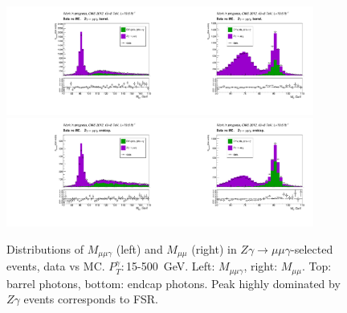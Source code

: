 \begin{figure}[htb]
  \begin{center}
   \includegraphics[width=0.45\textwidth]{../figs/figs_v11/MUON_ZGamma/PrepareYields/c_TotalDATAvsMC_Barrel__MpholeplepVERY_PRELIMINARY.pdf}\includegraphics[width=0.45\textwidth]{../figs/figs_v11/MUON_ZGamma/PrepareYields/c_TotalDATAvsMC_Barrel__MleplepVERY_PRELIMINARY.pdf}\\
   \includegraphics[width=0.45\textwidth]{../figs/figs_v11/MUON_ZGamma/PrepareYields/c_TotalDATAvsMC_Endcap__MpholeplepVERY_PRELIMINARY.pdf}\includegraphics[width=0.45\textwidth]{../figs/figs_v11/MUON_ZGamma/PrepareYields/c_TotalDATAvsMC_Endcap__MleplepVERY_PRELIMINARY.pdf}\\
  \caption{Distributions of $M_{\mu\mu\gamma}$ (left) and $M_{\mu\mu}$ (right) in $Z\gamma\rightarrow\mu\mu\gamma$-selected events, data vs MC. $P_T^{\gamma}: $15-500~GeV. Left: $M_{\mu\mu\gamma}$, right: $M_{\mu\mu}$. Top: barrel photons, bottom: endcap photons. Peak highly dominated by $Z\gamma$ events corresponds to FSR. }
  \label{fig:Zg_Mleplep_and_Mpholeplep}
  \end{center}
\end{figure}

